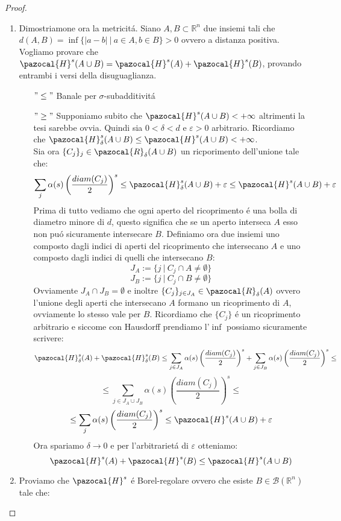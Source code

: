 \documentclass[11pt,a4paper]{report}
\theoremstyle{plain}
\theoremstyle{definition}
\newcommand{\Ha}{\pazocal{H}_\delta}
\newcommand{\Hu}{\pazocal{H}}
\newcommand{\B}{\mathcal{B}}
\begin{document}
\begin{proof}
\begin{enumerate}
\begin{enumerate}
			\end{enumerate}
		\item Dimostriamone ora la metricit\'a. Siano $A,B \subset \mathbb{R}^n$ due insiemi tali che $d(A,B) = \inf\{|a-b|\ |\ a \in A, b \in B\} > 0$ ovvero a distanza positiva. Vogliamo provare che $\Hu^s(A \cup B) = \Hu^s(A) + \Hu^s(B)$, provando entrambi i versi della disuguaglianza.
		\begin{itemize}
			\item[$"\le"$] Banale per $\sigma$-subadditivit\'a
			\item[$"\ge"$] Supponiamo subito che $\Hu^s(A \cup B) < +\infty$ altrimenti la tesi sarebbe ovvia. Quindi sia $0 < \delta < d$ e $\varepsilon > 0$ arbitrario. Ricordiamo che $\Ha^s(A \cup B) \le \Hu^s(A \cup B) < +\infty$.\\
			Sia ora $\{C_j\}_j \in \pazocal{R}_\delta(A \cup B)$ un ricporimento dell'unione tale che:
			\[
				\sum\limits_j \alpha(s) \left(\frac{diam(C_j)}{2}\right)^s  \le \Ha^s(A \cup B) + \varepsilon \le \Hu^s(A \cup B) + \varepsilon
			\] 
			Prima di tutto vediamo che ogni aperto del ricoprimento \'e una bolla di diametro minore di $d$, questo significa che se un aperto interseca $A$ esso non pu\'o sicuramente intersecare $B$. Definiamo ora due insiemi uno composto dagli indici di aperti del  ricoprimento che intersecano $A$ e uno composto dagli indici di quelli che intersecano $B$:
			\[
				J_A := \{j\ |\ C_j \cap A \ne \emptyset\}
			\]
			\[
				J_B := \{j\ |\ C_j \cap B  \ne \emptyset\}
			\]
			Ovviamente $J_A \cap J_B = \emptyset$ e inoltre $\{C_j\}_{j \in J_A} \in \pazocal{R}_\delta(A)$ ovvero l'unione degli aperti che intersecano $A$ formano un ricoprimento di $A$, ovviamente lo stesso vale per $B$. Ricordiamo che $\{C_j\}$ \'e un ricoprimento arbitrario e siccome con Hausdorff prendiamo l'$\inf$ possiamo sicuramente scrivere:
			\[
				\Ha^s(A) + \Ha^s(B) \le \sum\limits_{j \in J_A} \alpha(s) \left(\frac{diam(C_j)}{2}\right)^s + \sum\limits_{j \in J_B} \alpha(s) \left(\frac{diam(C_j)}{2}\right)^s \le
			\]
			\[
				\le \sum\limits_{j \in J_A \cup J_B} \alpha(s) \left(\frac{diam(C_j)}{2}\right)^s	\le
			\]
			\[
				\le \sum\limits_j \alpha(s) \left(\frac{diam(C_j)}{2}\right)^s \le \Hu^s(A \cup B) + \varepsilon			
			\]
			Ora spariamo $\delta \rightarrow 0$ e per l'arbitrariet\'a di $\varepsilon$ otteniamo:
			\[
				\Hu^s(A) + \Hu^s(B) \le \Hu^s(A \cup B)
			\]
		\end{itemize}
		\item Proviamo che $\Hu^s$ \'e Borel-regolare ovvero che esiste $B \in \B(\mathbb{R}^n)$ tale che:

\end{enumerate}
\end{proof}
\end{document}
